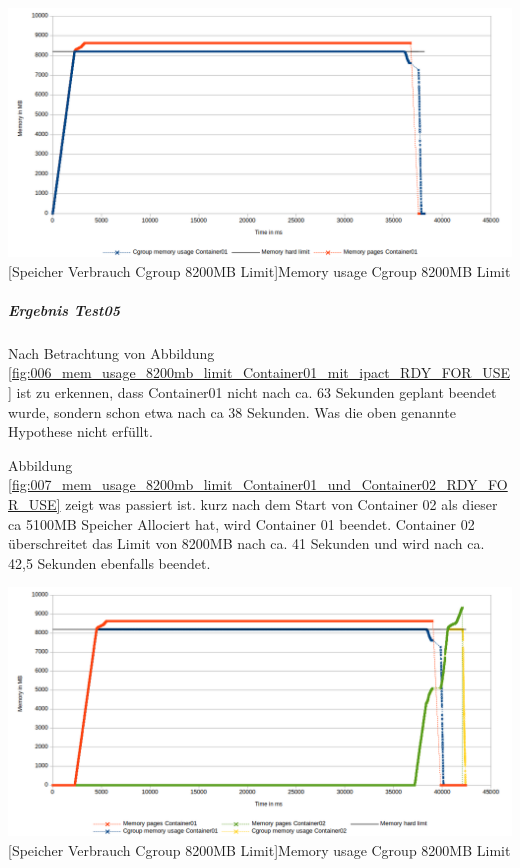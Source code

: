 \vspace{1em}
\begin{minipage}{\linewidth}
	\centering
	\includegraphics[width=1\linewidth]{pics/006_mem_usage_8200mb_limit_Container01_mit_ipact_RDY_FOR_USE.png}
	[Speicher Verbrauch Cgroup 8200MB Limit]{Memory usage Cgroup 8200MB Limit}
	\label{fig:006_mem_usage_8200mb_limit_Container01_mit_ipact_RDY_FOR_USE}
\end{minipage}

\subparagraph{Ergebnis Test05}
Nach Betrachtung von Abbildung \ref{fig:006_mem_usage_8200mb_limit_Container01_mit_ipact_RDY_FOR_USE} ist zu erkennen, dass Container01 nicht nach ca. 63 Sekunden geplant beendet wurde, sondern schon etwa nach ca 38 Sekunden. Was die oben genannte Hypothese nicht erfüllt.

Abbildung \ref{fig:007_mem_usage_8200mb_limit_Container01_und_Container02_RDY_FOR_USE} zeigt was passiert ist. kurz nach dem Start von Container 02 als dieser ca 5100MB Speicher Allociert hat, wird Container 01 beendet. Container 02 überschreitet das Limit von 8200MB nach ca. 41 Sekunden und wird nach ca. 42,5 Sekunden ebenfalls beendet.

\vspace{1em}
\begin{minipage}{\linewidth}
	\centering
	\includegraphics[width=1\linewidth]{pics/007_mem_usage_8200mb_limit_Container01_und_Container02_RDY_FOR_USE.png}
	[Speicher Verbrauch Cgroup 8200MB Limit]{Memory usage Cgroup 8200MB Limit}
	\label{fig:007_mem_usage_8200mb_limit_Container01_und_Container02_RDY_FOR_USE}
\end{minipage}

